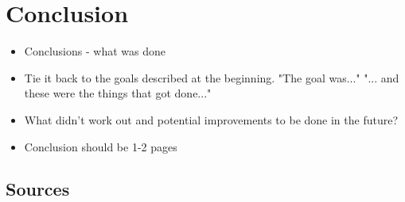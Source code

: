 \documentclass[a4paper, 12pt]{report} \linespread{1.3}
\begin{document}
\chapter{Conclusion}
\begin{itemize}
    \item Conclusions - what was done
    \item Tie it back to the goals described at the beginning. "The goal was..."
        "... and these were the things that got done..."
    \item What didn't work out and potential improvements to be done in the
        future?
    \item Conclusion should be 1-2 pages
\end{itemize}

\section{Sources}
\end{document}
